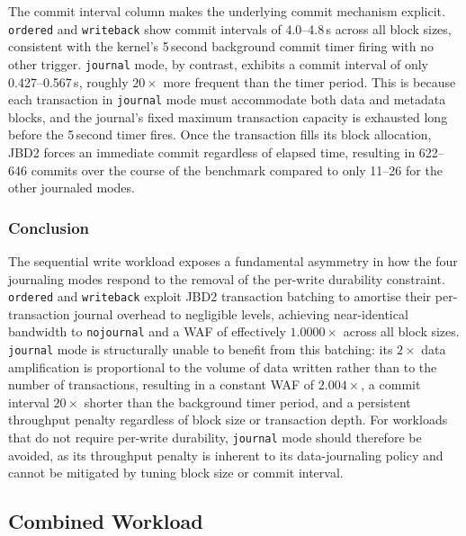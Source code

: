 \documentclass[12pt,a4paper]{article}
\begin{document}
The commit interval column makes the underlying commit mechanism explicit.
\texttt{ordered} and \texttt{writeback} show commit intervals of 4.0--4.8\,s across
all block sizes, consistent with the kernel's 5\,second background commit timer firing
with no other trigger. \texttt{journal} mode, by contrast, exhibits a commit interval
of only 0.427--0.567\,s, roughly $20\times$ more frequent than the timer period. This
is because each transaction in \texttt{journal} mode must accommodate both data and
metadata blocks, and the journal's fixed maximum transaction capacity is exhausted long
before the 5\,second timer fires. Once the transaction fills its block allocation, JBD2
forces an immediate commit regardless of elapsed time, resulting in 622--646 commits
over the course of the benchmark compared to only 11--26 for the other journaled modes.

\subsubsection{Conclusion}
The sequential write workload exposes a fundamental asymmetry in how the four journaling
modes respond to the removal of the per-write durability constraint. \texttt{ordered}
and \texttt{writeback} exploit JBD2 transaction batching to amortise their
per-transaction journal overhead to negligible levels, achieving near-identical
bandwidth to \texttt{nojournal} and a WAF of effectively $1.0000\times$ across all
block sizes. \texttt{journal} mode is structurally unable to benefit from this
batching: its $2\times$ data amplification is proportional to the volume of data
written rather than to the number of transactions, resulting in a constant WAF of
$2.004\times$, a commit interval $20\times$ shorter than the background timer period,
and a persistent throughput penalty regardless of block size or transaction depth. For
workloads that do not require per-write durability, \texttt{journal} mode should
therefore be avoided, as its throughput penalty is inherent to its data-journaling
policy and cannot be mitigated by tuning block size or commit interval.

\subsection{Combined Workload}
\end{document}
